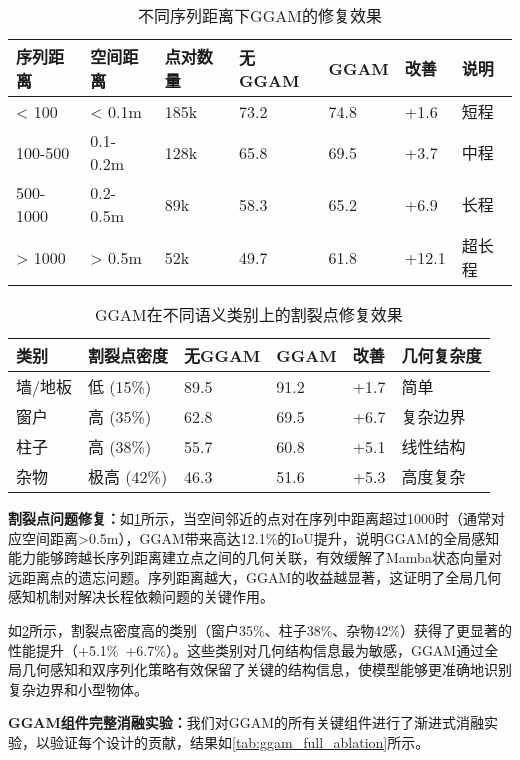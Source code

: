 \documentclass[preprint,12pt]{elsarticle}
\begin{document}
\begin{table}[htbp!]
	\centering
	\caption{不同序列距离下GGAM的修复效果}
	\label{tab:split_distance_analysis}
	\begin{tabular}{@{}lllllll@{}}
		\toprule
		序列距离 & 空间距离 & 点对数量 & 无GGAM & GGAM & 改善 & 说明 \\ 
		\midrule
		< 100 & < 0.1m & 185k & 73.2 & 74.8 & +1.6 & 短程 \\
		100-500 & 0.1-0.2m & 128k & 65.8 & 69.5 & +3.7 & 中程 \\
		500-1000 & 0.2-0.5m & 89k & 58.3 & 65.2 & +6.9 & 长程 \\
		> 1000 & > 0.5m & 52k & 49.7 & 61.8 & +12.1 & 超长程 \\
		\bottomrule
	\end{tabular}
\end{table}

\begin{table}[htbp!]
	\centering
	\caption{GGAM在不同语义类别上的割裂点修复效果}
	\label{tab:split_point_per_class}
	\begin{tabular}{@{}llllll@{}}
		\toprule
		类别 & 割裂点密度 & 无GGAM & GGAM & 改善 & 几何复杂度 \\ 
		\midrule
		墙/地板 & 低 (15\%) & 89.5 & 91.2 & +1.7 & 简单 \\
		窗户 & 高 (35\%) & 62.8 & 69.5 & +6.7 & 复杂边界 \\
		柱子 & 高 (38\%) & 55.7 & 60.8 & +5.1 & 线性结构 \\
		杂物 & 极高 (42\%) & 46.3 & 51.6 & +5.3 & 高度复杂 \\
		\bottomrule
	\end{tabular}
\end{table}

\textbf{割裂点问题修复：}如\cref{tab:split_distance_analysis}所示，当空间邻近的点对在序列中距离超过1000时（通常对应空间距离>0.5m），GGAM带来高达12.1\%的IoU提升，说明GGAM的全局感知能力能够跨越长序列距离建立点之间的几何关联，有效缓解了Mamba状态向量对远距离点的遗忘问题。序列距离越大，GGAM的收益越显著，这证明了全局几何感知机制对解决长程依赖问题的关键作用。

如\cref{tab:split_point_per_class}所示，割裂点密度高的类别（窗户35\%、柱子38\%、杂物42\%）获得了更显著的性能提升（+5.1\%~+6.7\%）。这些类别对几何结构信息最为敏感，GGAM通过全局几何感知和双序列化策略有效保留了关键的结构信息，使模型能够更准确地识别复杂边界和小型物体。

\textbf{GGAM组件完整消融实验：}我们对GGAM的所有关键组件进行了渐进式消融实验，以验证每个设计的贡献，结果如\cref{tab:ggam_full_ablation}所示。
\end{document}
